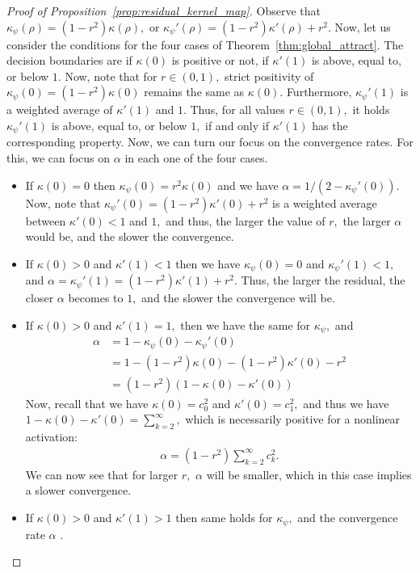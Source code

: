 \documentclass[twoside]{article}
\theoremstyle{definition}
\begin{document}
\begin{proof}[Proof of Proposition~\ref{prop:residual_kernel_map}]
Observe that $\kappa_\psi(\rho) = (1-r^2) \kappa(\rho),$ or $\kappa_\psi'(\rho) = (1-r^2) \kappa'(\rho) + r^2.$ Now, let us consider the conditions for the four cases of Theorem~\ref{thm:global_attract}. The decision boundaries are if $\kappa(0)$ is positive or not, if $\kappa'(1)$ is above, equal to, or below $1.$ Now, note that for $r \in (0,1),$ strict positivity of $\kappa_\psi(0) = (1-r^2) \kappa(0)$ remains the same as $\kappa(0).$ Furthermore, $\kappa_\psi'(1)$ is a weighted average of $\kappa'(1)$ and $1.$ Thus, for all values $r\in(0,1),$ it holds $\kappa_\psi'(1)$ is above, equal to, or below $1,$ if and only if $\kappa'(1)$ has the corresponding property.  Now, we can turn our focus on the convergence rates. For this, we can focus on $\alpha$ in each one of the four cases. 
\begin{itemize}
    \item If $\kappa(0)=0$ then $\kappa_\psi(0) = r^2 \kappa(0)$ and we have $\alpha = 1 / (2-\kappa_\psi'(0)).$ Now, note that $\kappa_\psi'(0) = (1-r^2)\kappa'(0) +  r^2$ is a weighted average between $\kappa'(0) < 1$ and $1,$ and thus, the larger the value of $r,$ the larger $\alpha$ would be, and the slower the convergence. 
    \item If $\kappa(0)>0$ and $\kappa'(1)<1$ then we have $\kappa_\psi(0)=0$ and $\kappa_\psi'(1) < 1,$ and $\alpha = \kappa_\psi'(1) = (1-r^2) \kappa'(1) + r^2.$ Thus, the larger the residual, the closer $\alpha$ becomes to $1,$ and the slower the convergence will be.  
    \item If $\kappa(0)>0$ and $\kappa'(1)=1,$ then we have the same for $\kappa_\psi,$ and 
    \begin{align*}
        \alpha &= 1 - \kappa_\psi(0) - \kappa_\psi'(0)\\
        &= 1 - (1-r^2) \kappa(0) - (1-r^2)\kappa'(0) - r^2\\
        &= (1-r^2 )( 1 - \kappa(0) - \kappa'(0))
    \end{align*}
    Now, recall that we have $\kappa(0) = c_0^2$ and $\kappa'(0)=c_1^2,$ and thus we have $1-\kappa(0) - \kappa'(0) = \sum_{k=2}^\infty,$ which is necessarily positive for a nonlinear activation:
    \begin{align*}
        \alpha = (1-r^2) \sum_{k=2}^\infty c_k^2.
    \end{align*}
    We can now see that for larger $r,$ $\alpha $ will be smaller, which in this case implies a slower convergence. 
    \item If $\kappa(0)>0$ and $\kappa'(1) > 1$ then same holds for $\kappa_\psi,$ and the convergence rate $\alpha$ .
\end{itemize}

\end{proof}
\end{document}
